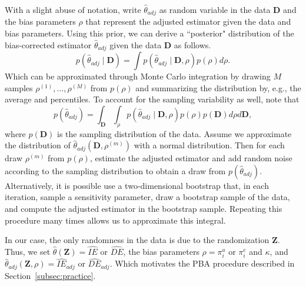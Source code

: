 \documentclass[11pt]{article}
\theoremstyle{definition}
\def \bZ {\boldsymbol{Z}}
\def \bD {\boldsymbol{D}}
\begin{document}
With a slight abuse of notation, write $\widehat{\theta}_{adj}$ as random variable 
in the data $\bD$ and the bias parameters $\rho$ that represent the adjusted 
estimator given the data and bias parameters.
Using this prior, we can derive a ``posterior" distribution of the bias-corrected estimator $\widehat{\theta}_{adj}$
given the data $\bD$ as follows.
\begin{equation*}
    p\left(\widehat{\theta}_{adj} \mid \bD \right)
    =
    \int
    p\left(\widehat{\theta}_{adj} \mid \bD, \rho \right)
    p(\rho)
    d\rho.
\end{equation*}
Which can be approximated through Monte Carlo integration by
drawing $M$ samples $\rho^{(1)}, \ldots, \rho^{(M)}$ from $p(\rho)$ and summarizing the
distribution by, e.g., the average and percentiles.
To account for the sampling variability as well, note that 
\begin{equation*}
    p\left(\widehat{\theta}_{adj} \right)
    =
    \int_{\bD}
    \int_{\rho}
    p\left(\widehat{\theta}_{adj} \mid \bD, \rho \right)
    p(\rho)
    p(\bD)
    d\rho d\bD,
\end{equation*}
where $p(\bD)$ is the sampling distribution of the data.
Assume we approximate the distribution of $\widehat{\theta}_{adj}(\bD, \rho^{(m)})$
 with a normal distribution.
Then for each draw $\rho^{(m)}$ from $p(\rho)$, estimate the adjusted estimator
and add random noise according to the sampling distribution
to obtain a draw from $p\left(\widehat{\theta}_{adj} \right)$.
Alternatively, it is possible use a two-dimensional bootstrap
that, in each iteration, sample a sensitivity parameter, draw a bootstrap sample of the data,
and compute the adjusted estimator in the bootstrap sample.
Repeating this procedure many times allows us to approximate this integral.

 In our case, the only randomness in the data is due to the randomization $\bZ$.
 Thus,
 we set $\widehat{\theta}(\bZ) = \widehat{IE}$ or $\widehat{DE}$,
    the bias parameters 
    $\rho = \pi_i^a$ or $\pi_i^e$ and $\kappa$,
    and $\widehat{\theta}_{adj}(\bZ, \rho) = \widehat{IE}_{adj}$ or $\widehat{DE}_{adj}$.
    Which motivates the PBA procedure described in Section~\ref{subsec:practice}.
\end{document}
